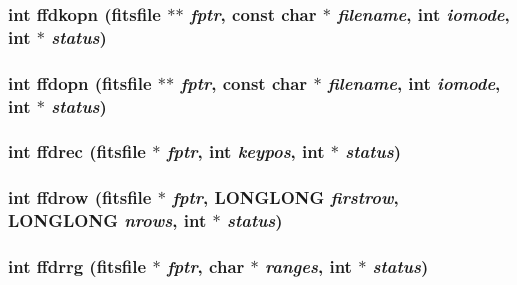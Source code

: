 \subsubsection{\setlength{\rightskip}{0pt plus 5cm}int ffdkopn (\bf{fitsfile} $\ast$$\ast$ {\em fptr}, const char $\ast$ {\em filename}, int {\em iomode}, int $\ast$ {\em status})}\label{fitsio_8h_891bfcf028003e840a9f554842123fce}


\subsubsection{\setlength{\rightskip}{0pt plus 5cm}int ffdopn (\bf{fitsfile} $\ast$$\ast$ {\em fptr}, const char $\ast$ {\em filename}, int {\em iomode}, int $\ast$ {\em status})}\label{fitsio_8h_2bf742ed269ae35cef1f7ddfc146ccb3}


\subsubsection{\setlength{\rightskip}{0pt plus 5cm}int ffdrec (\bf{fitsfile} $\ast$ {\em fptr}, int {\em keypos}, int $\ast$ {\em status})}\label{fitsio_8h_a0470408dc45f3c4b0d813f8558b6afc}


\subsubsection{\setlength{\rightskip}{0pt plus 5cm}int ffdrow (\bf{fitsfile} $\ast$ {\em fptr}, \bf{LONGLONG} {\em firstrow}, \bf{LONGLONG} {\em nrows}, int $\ast$ {\em status})}\label{fitsio_8h_9012004200b2e01ba5202319cac22a3d}


\subsubsection{\setlength{\rightskip}{0pt plus 5cm}int ffdrrg (\bf{fitsfile} $\ast$ {\em fptr}, char $\ast$ {\em ranges}, int $\ast$ {\em status})}\label{fitsio_8h_193b5d6c2d1fd0dec8af3d08a1156120}


